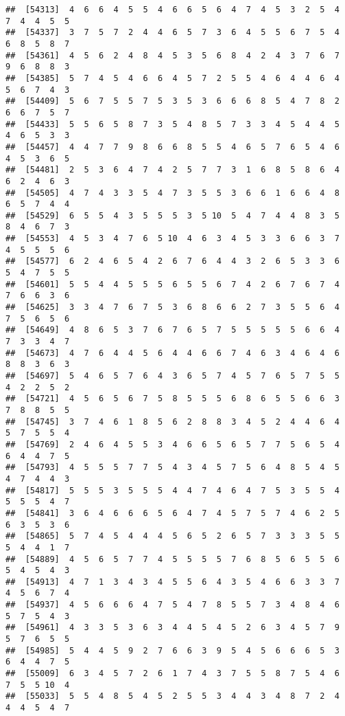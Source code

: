 \documentclass[
]{book}
\begin{document}
\begin{verbatim}
##  [54313]  4  6  6  4  5  5  4  6  6  5  6  4  7  4  5  3  2  5  4  7  4  4  5  5
##  [54337]  3  7  5  7  2  4  4  6  5  7  3  6  4  5  5  6  7  5  4  6  8  5  8  7
##  [54361]  4  5  6  2  4  8  4  5  3  5  6  8  4  2  4  3  7  6  7  9  6  8  8  3
##  [54385]  5  7  4  5  4  6  6  4  5  7  2  5  5  4  6  4  4  6  4  5  6  7  4  3
##  [54409]  5  6  7  5  5  7  5  3  5  3  6  6  6  8  5  4  7  8  2  6  6  7  5  7
##  [54433]  5  5  6  5  8  7  3  5  4  8  5  7  3  3  4  5  4  4  5  4  6  5  3  3
##  [54457]  4  4  7  7  9  8  6  6  8  5  5  4  6  5  7  6  5  4  6  4  5  3  6  5
##  [54481]  2  5  3  6  4  7  4  2  5  7  7  3  1  6  8  5  8  6  4  6  2  4  6  3
##  [54505]  4  7  4  3  3  5  4  7  3  5  5  3  6  6  1  6  6  4  8  6  5  7  4  4
##  [54529]  6  5  5  4  3  5  5  5  3  5 10  5  4  7  4  4  8  3  5  8  4  6  7  3
##  [54553]  4  5  3  4  7  6  5 10  4  6  3  4  5  3  3  6  6  3  7  4  5  5  5  6
##  [54577]  6  2  4  6  5  4  2  6  7  6  4  4  3  2  6  5  3  3  6  5  4  7  5  5
##  [54601]  5  5  4  4  5  5  5  6  5  5  6  7  4  2  6  7  6  7  4  7  6  6  3  6
##  [54625]  3  3  4  7  6  7  5  3  6  8  6  6  2  7  3  5  5  6  4  7  5  6  5  6
##  [54649]  4  8  6  5  3  7  6  7  6  5  7  5  5  5  5  5  6  6  4  7  3  3  4  7
##  [54673]  4  7  6  4  4  5  6  4  4  6  6  7  4  6  3  4  6  4  6  8  8  3  6  3
##  [54697]  5  4  6  5  7  6  4  3  6  5  7  4  5  7  6  5  7  5  5  4  2  2  5  2
##  [54721]  4  5  6  5  6  7  5  8  5  5  5  6  8  6  5  5  6  6  3  7  8  8  5  5
##  [54745]  3  7  4  6  1  8  5  6  2  8  8  3  4  5  2  4  4  6  4  5  7  5  5  4
##  [54769]  2  4  6  4  5  5  3  4  6  6  5  6  5  7  7  5  6  5  4  6  4  4  7  5
##  [54793]  4  5  5  5  7  7  5  4  3  4  5  7  5  6  4  8  5  4  5  4  7  4  4  3
##  [54817]  5  5  5  3  5  5  5  4  4  7  4  6  4  7  5  3  5  5  4  5  5  5  4  7
##  [54841]  3  6  4  6  6  6  5  6  4  7  4  5  7  5  7  4  6  2  5  6  3  5  3  6
##  [54865]  5  7  4  5  4  4  4  5  6  5  2  6  5  7  3  3  3  5  5  5  4  4  1  7
##  [54889]  4  5  6  5  7  7  4  5  5  5  5  7  6  8  5  6  5  5  6  5  4  5  4  3
##  [54913]  4  7  1  3  4  3  4  5  5  6  4  3  5  4  6  6  3  3  7  4  5  6  7  4
##  [54937]  4  5  6  6  6  4  7  5  4  7  8  5  5  7  3  4  8  4  6  5  7  5  4  3
##  [54961]  4  3  3  5  3  6  3  4  4  5  4  5  2  6  3  4  5  7  9  5  7  6  5  5
##  [54985]  5  4  4  5  9  2  7  6  6  3  9  5  4  5  6  6  6  5  3  6  4  4  7  5
##  [55009]  6  3  4  5  7  2  6  1  7  4  3  7  5  5  8  7  5  4  6  7  5  5 10  4
##  [55033]  5  5  4  8  5  4  5  2  5  5  3  4  4  3  4  8  7  2  4  4  4  5  4  7

\end{verbatim}
\end{document}
